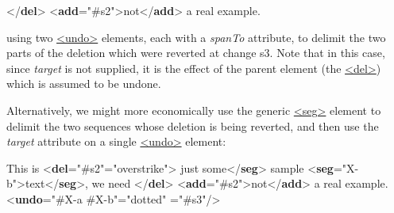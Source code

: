 \begin{shaded}
{</\textbf{del}>}\mbox{}\newline 
{<\textbf{add}\hspace*{1em}{change}="{\#s2}">}not{</\textbf{add}>} a real example.\mbox{}\newline 
\end{shaded}\egroup\par \noindent  using two \hyperref[TEI.undo]{<undo>} elements, each with a {\itshape spanTo} attribute, to delimit the two parts of the deletion which were reverted at change s3. Note that in this case, since {\itshape target} is not supplied, it is the effect of the parent element (the \hyperref[TEI.del]{<del>}) which is assumed to be undone.\par
Alternatively, we might more economically use the generic \hyperref[TEI.seg]{<seg>} element to delimit the two sequences whose deletion is being reverted, and then use the {\itshape target} attribute on a single \hyperref[TEI.undo]{<undo>} element: \par\bgroup{}\exampleFont \begin{shaded}\noindent\mbox{} This is {<\textbf{del}\hspace*{1em}{change}="{\#s2}"\hspace*{1em}{rend}="{overstrike}">}\mbox{}\newline 
{}just some{</\textbf{seg}>} sample {<\textbf{seg}\hspace*{1em}{xml:id}="{X-b}">}text{</\textbf{seg}>}, we\mbox{}\newline 
 need\mbox{}\newline 
{</\textbf{del}>}\mbox{}\newline 
{<\textbf{add}\hspace*{1em}{change}="{\#s2}">}not{</\textbf{add}>} a real example.\mbox{}\newline 
\mbox{}\newline 
{<\textbf{undo}\hspace*{1em}{target}="{\#X-a \#X-b}"\hspace*{1em}{rend}="{dotted}"\mbox{}\newline 
\hspace*{1em}{change}="{\#s3}"/>}\end{shaded}\egroup\par \noindent  

